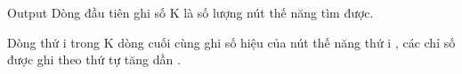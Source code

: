 Output
Dòng đầu tiên ghi số K là số lượng nút thế năng tìm được.


Dòng thứ i trong K dòng cuối cùng ghi số hiệu của nút thế năng thứ i , các chỉ số được ghi theo thứ tự tăng dần .